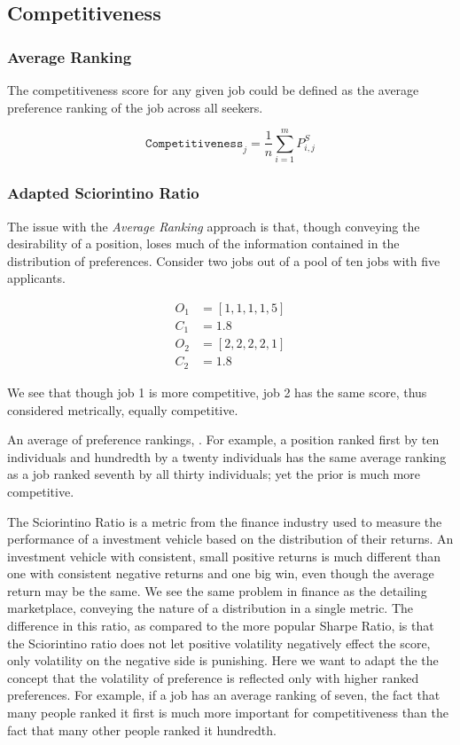 \subsection{Competitiveness}

\subsubsection{Average Ranking}

The competitiveness score for any given job could be defined as the average preference ranking of the job across all seekers.

\[\texttt{Competitiveness}_j = \frac{1}{n} \sum_{i=1}^m P^S_{i,j}\]

\subsubsection{Adapted Sciorintino Ratio}

The issue with the \textit{Average Ranking} approach is that, though conveying the desirability of a position, loses much of the information contained in the distribution of preferences. Consider two jobs out of a pool of ten jobs with five applicants.

\begin{align}
O_1 &= [1,1,1,1,5] \\
C_1 &= 1.8\\
O_2 &= [2,2,2,2,1] \\
C_2 &= 1.8
\end{align}

We see that though job 1 is more competitive, job 2 has the same score, thus considered metrically, equally competitive.

An average of preference rankings, . For example, a position ranked first by ten individuals and hundredth by a twenty individuals has the same average ranking as a job ranked seventh by all thirty individuals; yet the prior is much more competitive. 

The Sciorintino Ratio is a metric from the finance industry used to measure the performance of a investment vehicle based on the distribution of their returns. An investment vehicle with consistent, small positive returns is much different than one with consistent negative returns and one big win, even though the average return may be the same. We see the same problem in finance as the detailing marketplace, conveying the nature of a distribution in a single metric. The difference in this ratio, as compared to the more popular Sharpe Ratio, is that the Sciorintino ratio does not let positive volatility negatively effect the score, only volatility on the negative side is punishing. Here we want to adapt the the concept that the volatility of preference is reflected only with higher ranked preferences. For example, if a job has an average ranking of seven, the fact that many people ranked it first is much more important for competitiveness than the fact that many other people ranked it hundredth.

